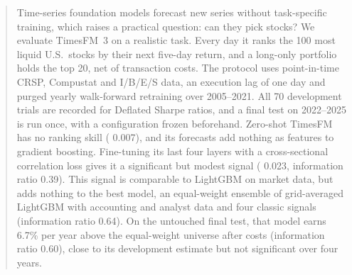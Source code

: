 \begin{abstract}
Time-series foundation models forecast new series without task-specific training, which raises a practical question: can they pick stocks?
We evaluate TimesFM~3 on a realistic task.
Every day it ranks the 100 most liquid U.S.\ stocks by their next five-day return, and a long-only portfolio holds the top 20, net of transaction costs.
The protocol uses point-in-time CRSP, Compustat and I/B/E/S data, an execution lag of one day and purged yearly walk-forward retraining over 2005--2021.
All 70 development trials are recorded for Deflated Sharpe ratios, and a final test on 2022--2025 is run once, with a configuration frozen beforehand.
Zero-shot TimesFM has no ranking skill (\ric{} 0.007), and its forecasts add nothing as features to gradient boosting.
Fine-tuning its last four layers with a cross-sectional correlation loss gives it a significant but modest signal (\ric{} 0.023, information ratio 0.39).
This signal is comparable to LightGBM on market data, but adds nothing to the best model, an equal-weight ensemble of grid-averaged LightGBM with accounting and analyst data and four classic signals (information ratio 0.64).
On the untouched final test, that model earns 6.7\% per year above the equal-weight universe after costs (information ratio 0.60), close to its development estimate but not significant over four years.
\end{abstract}
